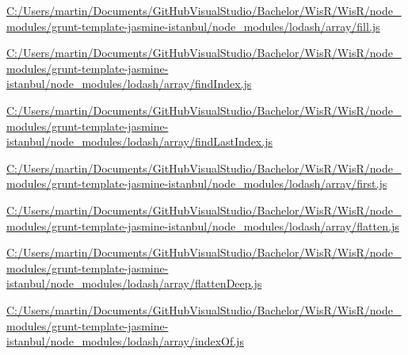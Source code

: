 \begin{DoxyCompactItemize}
\item 
\hyperlink{_c_1_2_users_2martin_2_documents_2_git_hub_visual_studio_2_bachelor_2_wis_r_2_wis_r_2node_modulebe17ae2452bbbc9045a9af16bb976b6e}{C\+:/\+Users/martin/\+Documents/\+Git\+Hub\+Visual\+Studio/\+Bachelor/\+Wis\+R/\+Wis\+R/node\+\_\+modules/grunt-\/template-\/jasmine-\/istanbul/node\+\_\+modules/lodash/array/fill.\+js}
\item 
\hyperlink{_c_1_2_users_2martin_2_documents_2_git_hub_visual_studio_2_bachelor_2_wis_r_2_wis_r_2node_module1833c505e39198ed376b4ed606456b71}{C\+:/\+Users/martin/\+Documents/\+Git\+Hub\+Visual\+Studio/\+Bachelor/\+Wis\+R/\+Wis\+R/node\+\_\+modules/grunt-\/template-\/jasmine-\/istanbul/node\+\_\+modules/lodash/array/find\+Index.\+js}
\item 
\hyperlink{_c_1_2_users_2martin_2_documents_2_git_hub_visual_studio_2_bachelor_2_wis_r_2_wis_r_2node_module6479051ee1bf5b1df998a35f2a1d7d09}{C\+:/\+Users/martin/\+Documents/\+Git\+Hub\+Visual\+Studio/\+Bachelor/\+Wis\+R/\+Wis\+R/node\+\_\+modules/grunt-\/template-\/jasmine-\/istanbul/node\+\_\+modules/lodash/array/find\+Last\+Index.\+js}
\item 
\hyperlink{_c_1_2_users_2martin_2_documents_2_git_hub_visual_studio_2_bachelor_2_wis_r_2_wis_r_2node_module208c141f9cf432bad701e3188a5e6410}{C\+:/\+Users/martin/\+Documents/\+Git\+Hub\+Visual\+Studio/\+Bachelor/\+Wis\+R/\+Wis\+R/node\+\_\+modules/grunt-\/template-\/jasmine-\/istanbul/node\+\_\+modules/lodash/array/first.\+js}
\item 
\hyperlink{_c_1_2_users_2martin_2_documents_2_git_hub_visual_studio_2_bachelor_2_wis_r_2_wis_r_2node_module45dfce6b9c0f9c01e23f33e5addc8842}{C\+:/\+Users/martin/\+Documents/\+Git\+Hub\+Visual\+Studio/\+Bachelor/\+Wis\+R/\+Wis\+R/node\+\_\+modules/grunt-\/template-\/jasmine-\/istanbul/node\+\_\+modules/lodash/array/flatten.\+js}
\item 
\hyperlink{_c_1_2_users_2martin_2_documents_2_git_hub_visual_studio_2_bachelor_2_wis_r_2_wis_r_2node_module5fb450a84e30de3f3a34cb5f2ed70695}{C\+:/\+Users/martin/\+Documents/\+Git\+Hub\+Visual\+Studio/\+Bachelor/\+Wis\+R/\+Wis\+R/node\+\_\+modules/grunt-\/template-\/jasmine-\/istanbul/node\+\_\+modules/lodash/array/flatten\+Deep.\+js}
\item 
\hyperlink{_c_1_2_users_2martin_2_documents_2_git_hub_visual_studio_2_bachelor_2_wis_r_2_wis_r_2node_module54c7d9ba4ee9752b07652d7968c87e3d}{C\+:/\+Users/martin/\+Documents/\+Git\+Hub\+Visual\+Studio/\+Bachelor/\+Wis\+R/\+Wis\+R/node\+\_\+modules/grunt-\/template-\/jasmine-\/istanbul/node\+\_\+modules/lodash/array/index\+Of.\+js}

\end{DoxyCompactItemize}

